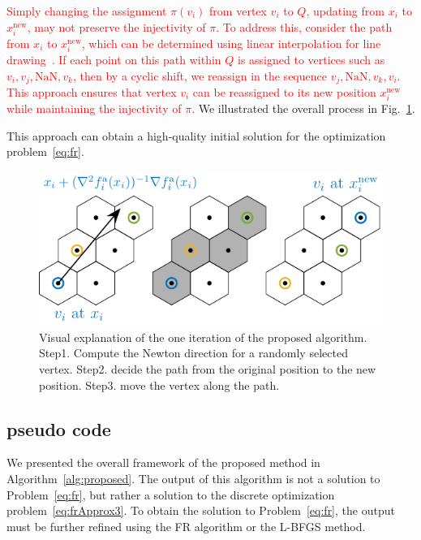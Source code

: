 \documentclass[dvipdfmx,journal]{IEEEtran}
\newcommand{\red}[1]{\textcolor{red}{#1}}
\begin{document}
\red{
    Simply changing the assignment $\pi(v_i)$ from vertex $v_i$ to $Q$, updating from $x_i$ to $x_i^\mathrm{new}$, may not preserve the injectivity of $\pi$. To address this, consider the path from $x_i$ to $x_i^\mathrm{new}$, which can be determined using linear interpolation for line drawing~\cite{patelHexagonalGrids2013}. If each point on this path within $Q$ is assigned to vertices such as $v_i, v_j, \text{NaN}, v_k$, then by a cyclic shift, we reassign in the sequence $v_j, \text{NaN}, v_k, v_i$. This approach ensures that vertex $v_i$ can be reassigned to its new position $x_i^\mathrm{new}$ while maintaining the injectivity of $\pi$.
}
We illustrated the overall process in Fig.~\ref{fig:hex}.

This approach can obtain a high-quality initial solution for the optimization problem~\eqref{eq:fr}.

\begin{figure}[t]
    \centering
    \includegraphics[width=\columnwidth]{hex/hex.pdf}
    \caption{Visual explanation of the one iteration of the proposed algorithm. Step1. Compute the Newton direction for a randomly selected vertex. Step2. decide the path from the original position to the new position. Step3. move the vertex along the path.}
    \label{fig:hex}
\end{figure}

\subsection{pseudo code}\label{ssec:pseudoCode}

We presented the overall framework of the proposed method in Algorithm~\ref{alg:proposed}.
The output of this algorithm is not a solution to Problem~\eqref{eq:fr}, but rather a solution to the discrete optimization problem~\eqref{eq:frApprox3}.
To obtain the solution to Problem~\eqref{eq:fr}, the output must be further refined using the FR algorithm or the L-BFGS method.
\end{document}
